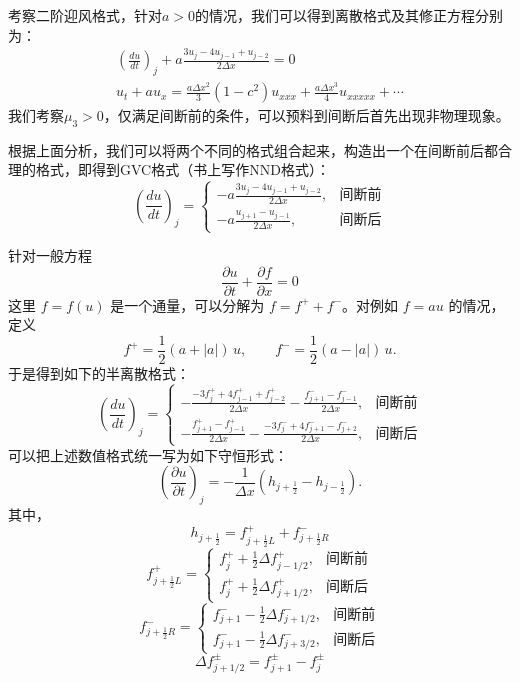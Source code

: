 \documentclass[12pt,a4paper]{article}%
\begin{document}
		考察二阶迎风格式，针对$a>0$的情况，我们可以得到离散格式及其修正方程分别为：
		\begin{gather}
			(\frac{du}{dt})_j + a\frac{3u_j - 4u_{j-1}+u_{j-2}}{2\Delta x} = 0 \\
			u_t + au_x = \frac{a\Delta x^2}{3}(1-c^2)u_{xxx} + \frac{a\Delta x^3}{4}u_{xxxxx}+\cdots
		\end{gather}
		我们考察$\mu_3>0$，仅满足间断前的条件，可以预料到间断后首先出现非物理现象。
		
		根据上面分析，我们可以将两个不同的格式组合起来，构造出一个在间断前后都合理的格式，即得到GVC格式（书上写作NND格式）：
		\[
			(\frac{du}{dt})_j = 
			\begin{cases}
				-a\frac{3u_j - 4u_{j-1}+u_{j-2}}{2\Delta x}, & \text{间断前} \\
				-a\frac{u_{j+1}-u_{j-1}}{2\Delta x}, & \text{间断后}
			\end{cases}
		\]
		
		针对一般方程
		\[
		\frac{\partial u}{\partial t} + \frac{\partial f}{\partial x} = 0
		\]
		这里 \(f = f(u)\) 是一个通量，可以分解为 \(f = f^+ + f^-\)。对例如 \(f = a u\) 的情况，定义
		\[
		f^+ = \frac{1}{2}(a + |a|)\,u,\qquad
		f^- = \frac{1}{2}(a - |a|)\,u.
		\]
		于是得到如下的半离散格式：
		\[
		\left(\frac{du}{dt}\right)_j = 
		\begin{cases}
			-\frac{-3f_j^+ + 4f_{j-1}^+ + f_{j-2}^+}{2\Delta x} - \frac{f_{j+1}^- - f_{j-1}^-}{2\Delta x}, & \text{间断前} \\
			-\frac{ f_{j+1}^+ - f_{j-1}^+ }{2\Delta x} - \frac{-3f_j^- + 4f_{j+1}^- - f_{j+2}^-}{2\Delta x}, & \text{间断后}
		\end{cases}
		\]
		可以把上述数值格式统一写为如下守恒形式：
		\[
		(\frac{\partial u}{\partial t})_j = -\frac{1}{\Delta x}(h_{j+\frac12} - h_{j-\frac12}).
		\]
		其中，
		\[
			h_{j+\frac12} = f_{j+\frac12L}^+ + f_{j+\frac12R}^-
		\]
		\[
		f_{j+\frac12L}^+ = 
		\begin{cases}
			f_j^+ + \frac12\Delta f_{j-1/2}^+, & 间断前 \\
			f_j^+ + \frac12 \Delta f_{j+1/2}^+, & 间断后
		\end{cases}
		\]
		\[
		f_{j+\frac12R}^- = 
		\begin{cases}
			f_{j+1}^- - \frac12 \Delta f_{j+1/2}^-, & 间断前 \\
			f_{j+1}^- - \frac12 \Delta f_{j+3/2}^-, & 间断后
		\end{cases}
		\]
		\[
			\Delta f_{j+1/2}^{\pm} = f_{j+1}^{\pm} - f_j^{\pm}
		\]
		
\end{document}
